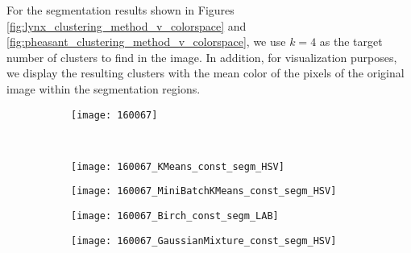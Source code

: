 For the segmentation results shown in Figures \ref{fig:lynx_clustering_method_v_colorspace} and \ref{fig:pheasant_clustering_method_v_colorspace}, we use $k = 4$ as the target number of clusters to find in the image. In addition, for visualization purposes, we display the resulting clusters with the mean color of the pixels of the original image within the segmentation regions. 

\begin{figure}[!ht]
         
    \begin{subfigure}[b]{\textwidth+20pt\relax}
    	\centering
    	\texttt{[image: 160067]} 
    \end{subfigure}  \\ \vspace{-5pt}    
    
    
    \begin{subfigure}[b]{\textwidth+20pt\relax}
    	\centering
    	\texttt{[image: 160067\_KMeans\_const\_segm\_HSV]} 
    \end{subfigure}      
    \begin{subfigure}[b]{0.23\textwidth}
    	\centering
        \texttt{[image: 160067\_MiniBatchKMeans\_const\_segm\_HSV]}
    \end{subfigure}
    \begin{subfigure}[b]{0.23\textwidth}
    	\centering
        \texttt{[image: 160067\_Birch\_const\_segm\_LAB]}
    \end{subfigure}
    \begin{subfigure}[b]{0.23\textwidth}
    	\centering
        \texttt{[image: 160067\_GaussianMixture\_const\_segm\_HSV]}
    \end{subfigure} \\ \vspace{-5pt}  
    

\end{figure}
